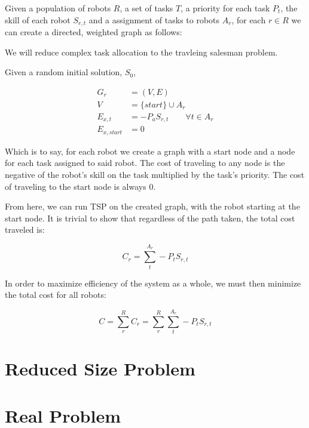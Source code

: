 \documentclass[a4paper]{article}
\begin{document}
Given a population of robots $R$, a set of tasks $T$, a priority for each task $P_t$, the
skill of each robot $S_{r,t}$ and a assignment of tasks to robots $A_r$, for each $r \in R$
we can create a directed, weighted graph as follows:

We will reduce complex task allocation to the travleing salesman problem.

Given a random initial solution, $S_0$,

\begin{align*}
	G_r &= (V, E) \\
	V &= \{ start \} \cup A_r \\
	E_{x, t} &= -P_a S_{r,t} \qquad \forall t \in A_r \\
	E_{x, start} &= 0
\end{align*}

Which is to say, for each robot we create a graph with a start node and a node for each task assigned to said robot. The cost of traveling to any node is the negative of the robot's skill on the task multiplied by the task's priority. The cost of traveling to the start node is always 0.

From here, we can run TSP on the created graph, with the robot starting at the start node. It is trivial to show that regardless of the path taken, the total cost traveled is:

$$C_r = \sum_t^{A_r} -P_t S_{r,t}$$

In order to maximize efficiency of the system as a whole, we must then minimize the total cost for all robots:

$$C = \sum_r^{R} C_r = \sum_r^{R} \sum_t^{A_r} -P_t S_{r,t}$$




\section{Reduced Size Problem}


\section{Real Problem}

\end{document}
